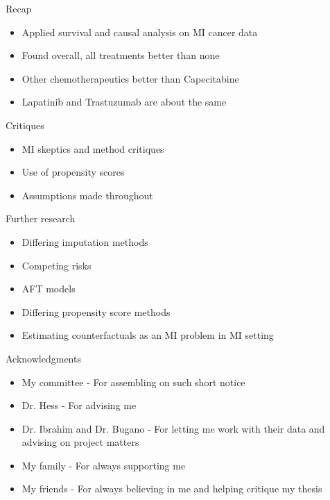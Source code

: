 \begin{frame}{Recap}
 \begin{itemize}
  \item Applied survival and causal analysis on MI cancer data
  \item Found overall, all treatments better than none
  \item Other chemotherapeutics better than Capecitabine
  \item Lapatinib and Trastuzumab are about the same
 \end{itemize}

\end{frame}


\begin{frame}{Critiques}
 \begin{itemize}
  \item MI skeptics and method critiques
  \item Use of propensity scores
  \item Assumptions made throughout
  \end{itemize}

\end{frame}


\begin{frame}{Further research}

\begin{itemize}
 \item Differing imputation methods
 \item Competing risks
 \item AFT models
 \item Differing propensity score methods
 \item Estimating counterfactuals as an MI problem in MI setting
 
\end{itemize}

 
\end{frame}

\begin{frame}{Acknowledgments}
 \begin{itemize}
  \item My committee - For assembling on such short notice
  \item Dr. Hess - For advising me 
  \item Dr. Ibrahim and Dr. Bugano - For letting me work with their data and advising
  on project matters
  \item My family - For always supporting me
  \item My friends - For always believing in me and helping critique my thesis
  
 \end{itemize}

\end{frame}

